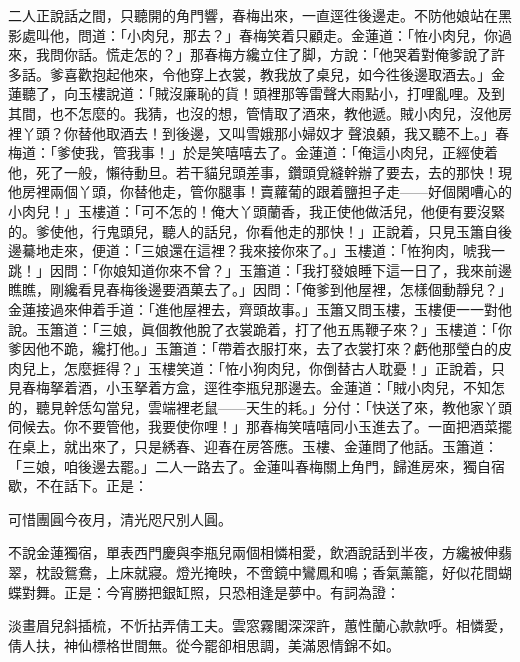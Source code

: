 二人正說話之間，只聽開的角門響，春梅出來，一直逕徃後邊走。不防他娘站在黑影處叫他，問道：「小肉兒，那去？」春梅笑着只顧走。{}金蓮道：「恠小肉兒，你過來，我問你話。慌走怎的？」那春梅方纔立住了脚，方說：「他哭着對俺爹說了許多話。爹喜歡抱起他來，令他穿上衣裳，教我放了桌兒，如今徃後邊取酒去。」金蓮聽了，向玉樓說道：「賊沒廉恥的貨！頭裡那等雷聲大雨點小，打哩亂哩。及到其間，也不怎麼的。我猜，也沒的想，管情取了酒來，教他遞。{}賊小肉兒，沒他房裡丫頭？你替他取酒去！到後邊，又叫雪娥那小婦奴才𣭈聲浪顙，{}我又聽不上。」春梅道：「爹使我，管我事！」於是笑嘻嘻去了。金蓮道：「俺這小肉兒，正經使着他，死了一般，懶待動旦。{}若干貓兒頭差事，鑽頭覓縫幹辦了要去，去的那快！現他房裡兩個丫頭，你替他走，管你腿事！賣蘿葡的跟着鹽担子走——好個閑嘈心的小肉兒！」玉樓道：「可不怎的！俺大丫頭蘭香，我正使他做活兒，他便有要沒緊的。爹使他，行鬼頭兒，聽人的話兒，你看他走的那快！」正說着，只見玉簫自後邊驀地走來，便道：「三娘還在這裡？我來接你來了。」玉樓道：「恠狗肉，唬我一跳！」{}因問：「你娘知道你來不曾？」玉簫道：「我打發娘睡下這一日了，我來前邊瞧瞧，剛纔看見春梅後邊要酒菓去了。」因問：「俺爹到他屋裡，怎樣個動靜兒？」金蓮接過來伸着手道：「進他屋裡去，齊頭故事。」{}玉簫又問玉樓，玉樓便一一對他說。玉簫道：「三娘，眞個教他脫了衣裳跪着，打了他五馬鞭子來？」玉樓道：「你爹因他不跪，纔打他。」玉簫道：「帶着衣服打來，去了衣裳打來？虧他那瑩白的皮肉兒上，怎麼捱得？」{}玉樓笑道：「恠小狗肉兒，你倒替古人耽憂！」正說着，只見春梅拏着酒，小玉拏着方盒，逕徃李瓶兒那邊去。金蓮道：「賊小肉兒，不知怎的，聽見幹恁勾當兒，雲端裡老鼠——天生的耗。」分付：「快送了來，教他家丫頭伺候去。你不要管他，我要使你哩！」那春梅笑嘻嘻同小玉進去了。一面把酒菜擺在桌上，就出來了，只是綉春、迎春在房答應。玉樓、金蓮問了他話。玉簫道：「三娘，咱後邊去罷。」二人一路去了。金蓮叫春梅關上角門，歸進房來，獨自宿歇，不在話下。正是：

\begin{myquote} 
可惜團圓今夜月，清光咫尺別人圓。
\end{myquote} 

不說金蓮獨宿，單表西門慶與李瓶兒兩個相憐相愛，飲酒說話到半夜，方纔被伸翡翠，枕設鴛鴦，上床就寢。燈光掩映，不啻鏡中鸞鳳和鳴；香氣薰籠，好似花間蝴蝶對舞。正是：今宵勝把銀缸照，只恐相逢是夢中。有詞為證：

\begin{myquote} 
淡畫眉兒斜插梳，不忻拈弄倩工夫。雲窓霧閣深深許，蕙性蘭心款款呼。相憐愛，倩人扶，神仙標格世間無。從今罷卻相思調，美滿恩情錦不如。
\end{myquote} 

